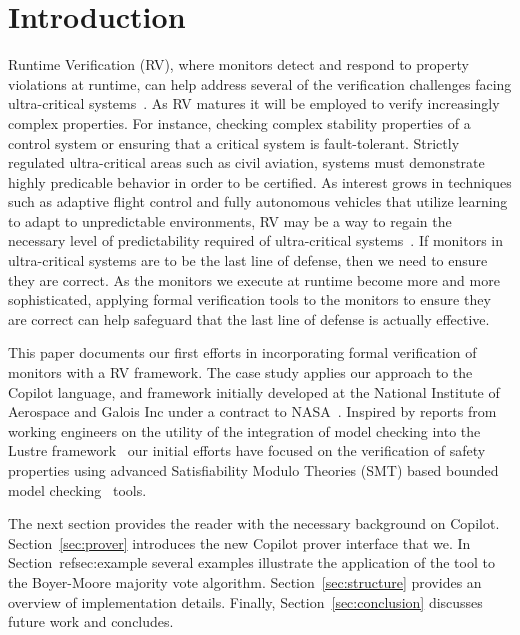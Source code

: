 \section{Introduction}\label{sec:intro}
Runtime Verification (RV), where monitors detect and respond to
property violations at runtime, can help address several of the
verification challenges facing ultra-critical
systems~\cite{pike-rv-11}.  As RV matures
it will be employed to verify increasingly complex 
properties. For instance, checking complex stability properties of a
control system or ensuring that a critical system is fault-tolerant.
Strictly regulated ultra-critical areas such as civil aviation,
systems must demonstrate highly predicable behavior in order to be
certified. As interest grows in techniques such as adaptive flight
control and fully autonomous vehicles that utilize learning to adapt
to unpredictable environments, RV may be a way to regain the necessary
level of predictability required of ultra-critical
systems~\cite{simplex}.  If
monitors in ultra-critical systems are to be the last line of defense,
then we need to ensure they are correct.  As the monitors we execute
at runtime become more and more sophisticated, applying formal
verification tools to the monitors to ensure they are correct can help
safeguard that the last line of defense is actually effective. 


This paper documents our first efforts in incorporating formal
verification of monitors with a RV framework. 
The case study applies our approach to the Copilot language, and
 framework initially developed at the National Institute of Aerospace
 and Galois Inc under a contract to NASA~\cite{copilot,pike-isse-13}.  
Inspired by reports from working engineers on the utility of the integration of model checking into the Lustre
framework~\cite{Hagen08} our initial efforts have focused on the
verification of safety properties using advanced  Satisfiability Modulo Theories
(SMT) based bounded model checking~\cite{ClarkeBounded01} tools.

 
The next section provides the reader with the necessary background on
Copilot. Section~\ref{sec:prover} introduces the new Copilot prover interface
that we. In Section~ref{sec:example}  several examples illustrate the
application of the tool to the Boyer-Moore majority vote
algorithm. Section~\ref{sec:structure} provides an overview of
implementation details. Finally, Section~\ref{sec:conclusion}
discusses future work and concludes. 

  


